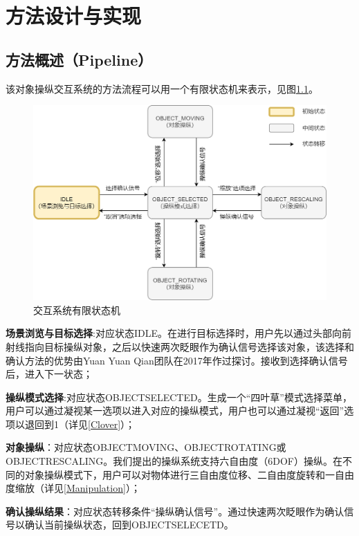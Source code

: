 
\chapter{方法设计与实现}

\section{方法概述（Pipeline）}

该对象操纵交互系统的方法流程可以用一个有限状态机来表示，见图\ref{fig-3-1}。

\begin{figure}[b!]
    \centering
    \includegraphics[width=.85\textwidth]{figure/system_state_machine.png}
    \caption{交互系统有限状态机}
    \label{fig-3-1}
\end{figure}

{\bf 场景浏览与目标选择}:对应状态IDLE。在进行目标选择时，用户先以通过头部向前射线指向目标操纵对象，之后以快速两次眨眼作为确认信号选择该对象，该选择和确认方法的优势由Yuan Yuan Qian团队在2017年作过探讨。接收到选择确认信号后，进入下一状态；

{\bf 操纵模式选择}:对应状态OBJECT\us SELECTED。生成一个“四叶草”模式选择菜单，用户可以通过凝视某一选项以进入对应的操纵模式，用户也可以通过凝视“返回”选项以退回到1（详见\autoref{Clover}）；

{\bf 对象操纵}：对应状态OBJECT\us MOVING、OBJECT\us ROTATING或OBJECT\us RESCALING。我们提出的操纵系统支持六自由度（6DOF）操纵。在不同的对象操纵模式下，用户可以对物体进行三自由度位移、二自由度旋转和一自由度缩放（详见\autoref{Manipulation}）；

{\bf 确认操纵结果}：对应状态转移条件“操纵确认信号”。通过快速两次眨眼作为确认信号以确认当前操纵状态，回到OBJECT\us SELECETD。

